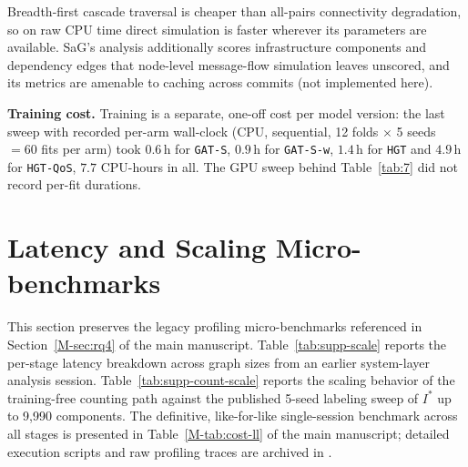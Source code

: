 \documentclass[preprint,3p]{elsarticle}
\begin{document}
\noindent Breadth-first cascade traversal is cheaper than all-pairs connectivity degradation, so on raw CPU time direct simulation is faster wherever its parameters are available. SaG's analysis additionally scores infrastructure components and dependency edges that node-level message-flow simulation leaves unscored, and its metrics are amenable to caching across commits (not implemented here).

\noindent\textbf{Training cost.} Training is a separate, one-off cost per model version: the last sweep with recorded per-arm wall-clock (CPU, sequential, 12 folds $\times$ 5 seeds $= 60$ fits per arm) took $0.6\,\text{h}$ for \texttt{GAT-S}, $0.9\,\text{h}$ for \texttt{GAT-S-w}, $1.4\,\text{h}$ for \texttt{HGT} and $4.9\,\text{h}$ for \texttt{HGT-QoS}, $7.7$ CPU-hours in all. The GPU sweep behind Table~\ref{tab:7} did not record per-fit durations.

\section{Latency and Scaling Micro-benchmarks}
\label{supp:scale}

This section preserves the legacy profiling micro-benchmarks referenced in Section~\ref{M-sec:rq4} of the main manuscript. Table~\ref{tab:supp-scale} reports the per-stage latency breakdown across graph sizes from an earlier system-layer analysis session. Table~\ref{tab:supp-count-scale} reports the scaling behavior of the training-free counting path against the published 5-seed labeling sweep of $I^*$ up to 9,990 components. The definitive, like-for-like single-session benchmark across all stages is presented in Table~\ref{M-tab:cost-ll} of the main manuscript; detailed execution scripts and raw profiling traces are archived in .
\end{document}
